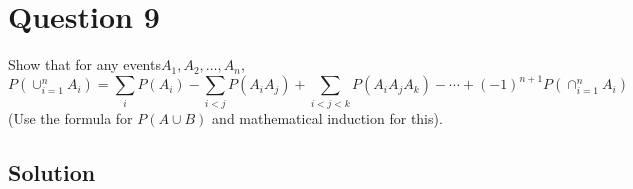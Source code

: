 \section*{Question 9}

Show that for any events\( A_{1}, A_{2}, \dots, A_{n} \),
\[
    P\left(\cup_{i=1}^{n} A_{i}\right)=\sum_{i} P\left(A_{i}\right)-\sum_{i<j} P\left(A_{i} A_{j}\right)+\sum_{i<j<k} P\left(A_{i} A_{j} A_{k}\right)-\cdots+(-1)^{n+1} P\left(\cap_{i=1}^{n} A_{i}\right)
\]
(Use the formula for \( P(A \cup B) \) and mathematical induction for this).

\subsection*{Solution}
